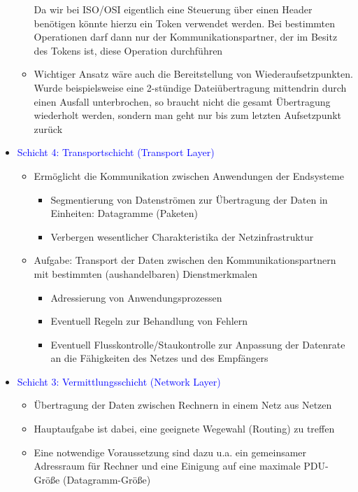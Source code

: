 \begin{itemize}
\begin{itemize}
        Da wir bei ISO/OSI eigentlich eine Steuerung über einen Header benötigen könnte hierzu ein Token verwendet werden.
        Bei bestimmten Operationen darf dann nur der Kommunikationspartner, der im Besitz des Tokens ist, diese Operation durchführen
        \item Wichtiger Ansatz wäre auch die Bereitstellung von Wiederaufsetzpunkten.
        Wurde beispielsweise eine 2-stündige Dateiübertragung mittendrin durch einen Ausfall unterbrochen, so braucht nicht die gesamt Übertragung wiederholt werden, sondern man geht nur bis zum letzten Aufsetzpunkt zurück
    \end{itemize}
    \item \textcolor{blue}{Schicht 4: Transportschicht (Transport Layer)}
    \begin{itemize}
        \item Ermöglicht die Kommunikation zwischen Anwendungen der Endsysteme
        \begin{itemize}
            \item Segmentierung von Datenströmen zur Übertragung der Daten in Einheiten: Datagramme (Paketen)
            \item Verbergen wesentlicher Charakteristika der Netzinfrastruktur
        \end{itemize}
        \item Aufgabe: Transport der Daten zwischen den Kommunikationspartnern mit bestimmten (aushandelbaren) Dienstmerkmalen
        \begin{itemize}
            \item Adressierung von Anwendungsprozessen
            \item Eventuell Regeln zur Behandlung von Fehlern
            \item Eventuell Flusskontrolle/Staukontrolle zur Anpassung der Datenrate an die Fähigkeiten des Netzes und des Empfängers
        \end{itemize}
    \end{itemize}
    \item \textcolor{blue}{Schicht 3: Vermittlungsschicht (Network Layer)}
    \begin{itemize}
        \item Übertragung der Daten zwischen Rechnern in einem Netz aus Netzen
        \item Hauptaufgabe ist dabei, eine geeignete Wegewahl (Routing) zu treffen
        \item Eine notwendige Voraussetzung sind dazu u.a. ein gemeinsamer Adressraum für Rechner und eine Einigung auf eine maximale PDU-Größe (Datagramm-Größe)

\end{itemize}
\end{itemize}
